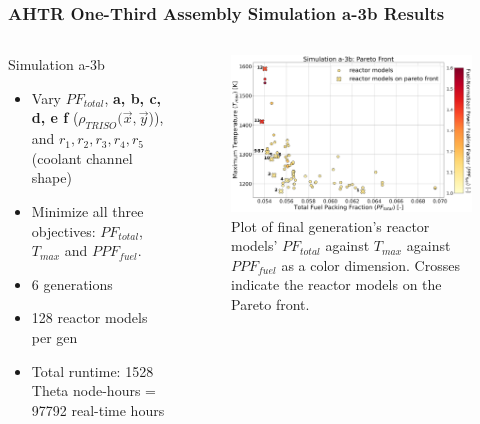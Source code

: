 \begin{frame}
    \frametitle{AHTR One-Third Assembly Simulation a-3b Results}
    \begin{columns}
    \begin{column}{0.35\textwidth}
        \begin{block}{Simulation a-3b}
            \begin{itemize}
            \item Vary $PF_{total}$, \textbf{a, b, c, d, e f} ($\rho_{TRISO}(\vec{x}, 
            \vec{y}$)), and $r_1, r_2, r_3, r_4, r_5$ (coolant channel shape) 
            \item Minimize all three objectives: $PF_{total}$, $T_{max}$ and $PPF_{fuel}$.
            \item 6 generations 
            \item 128 reactor models per gen 
            \item Total runtime: 1528 Theta node-hours = 97792 real-time hours 
            \end{itemize}
            \end{block}
        \end{column}
    \begin{column}{0.7\textwidth}
    \begin{figure}
        \includegraphics[width=\linewidth]{../docs/figures/assem-obj-3-all-2d.png} 
        \caption{Plot of final generation's reactor models' 
        $PF_{total}$ against $T_{max}$ against $PPF_{fuel}$ as a color dimension. 
        Crosses indicate the reactor models on the Pareto front.}
    \end{figure}
    \end{column}
\end{columns}
\end{frame}

